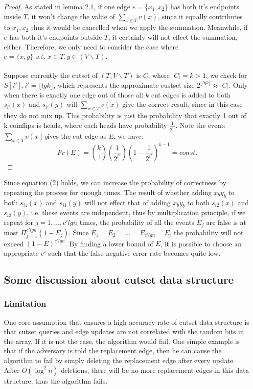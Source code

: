 \documentclass[conference,compsoc]{IEEEtran}
\begin{document}
\begin{proof}
As stated in lemma 2.1, if one edge $e=\{x_1,x_2\}$ has both it's endpoints inside $T$,  it won't change the value of $\sum_{x\in T} v(x)$, since it equally contributes to $x_1, x_2$ thus it would be cancelled when we apply the summation. Meanwhile, if $e$ has both it's endpoints outside $T$, it certainly will not effect the summation, either. Therefore, we only need to consider the case where $e=\{x,y\} \textit{ s.t. } x\in T, y \in (V\backslash T)$.\\\\ 
Suppose currently the cutset of $(T,V\backslash T)$ is $C$, where $|C|=k>1$, we check for $S[i'],i'=\lfloor lgk\rfloor$, which represents the approximate custset size $2^{\lfloor lgk\rfloor} \approx |C| $. Only when there is exactly one edge out of those all $k$ cut edges is added to both $s_{i'}(x)$ and $s_{i'}(y)$ will $\sum_{x\in T} v(x)$ give the correct result, since in this case they do not mix up. This probability is just the probability that exactly 1 out of k coinflips is heads, where each heads have probability $\frac{1}{2^{i'}}$. Note the event:$\sum_{x\in T} v(x)$\textit gives the cut edge as $E$, we have:
$$Pr(E)={k \choose 1}(\frac{1}{2^{i'}})(1-\frac{1}{2^{i'}})^{k-1} = const.$$
\end{proof}
Since equation (2) holds, we can increase the probability of correctness by repeating the process for enough times. The result of whether adding $x_by_b$ to both $s_{i1}(x)$ and $s_{i1}(y)$ will not effect that of adding $x_by_b$ to both  $s_{i2}(x)$ and $s_{i2}(y)$, i.e. these events are independent, thus by multiplication principle, if we repeat for $j=1,\dots,c'lgn$ times, the probability of all the events $E_j$ are false is at most $\Pi_{j=1}^{c'lgn}(1-E_j)$. Since $E_1=E_2=\dots=E_{c'lgn}=E$, the probability will not exceed $(1-E)^{c'lgn}$. By finding a lower bound of $E$, it is possible to choose an appropriate $c'$ such that the false negative error rate becomes quite low.
\subsection{Some discussion about cutset data structure}
\subsubsection*{Limitation}One core assumption that ensures a high accuracy rate of cutset data structure is that cutset queries and edge updates are not correlated with the random bits in the array. If it is not the case, the algorithm would fail. One simple example is that if the adversary is told the replacement edge, then he can cause the algorithm to fail by simply deleting the replacement edge after every update. After $O(\log^2n)$ deletions, there will be no more replacement edges in this data structure, thus the algorithm fails.
\end{document}
